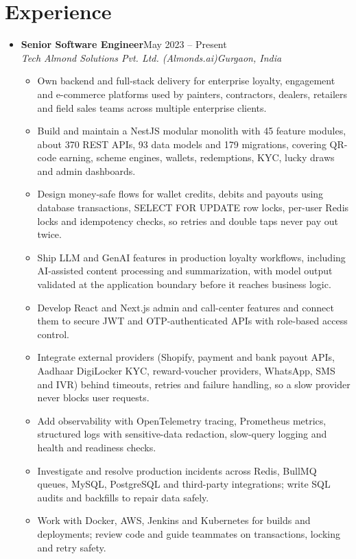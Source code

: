 \documentclass[letterpaper,10pt]{article}
\newcommand{\itemx}[1]{\item\small{#1\vspace{-2pt}}}
\newcommand{\subheading}[4]{\item \textbf{#1}\hfill #2\\\textit{\small #3}\hfill\textit{\small #4}\vspace{-5pt}}
\begin{document}
\section{Experience}
\begin{itemize}[leftmargin=.15in,label={}]
\subheading{Senior Software Engineer}{May 2023 -- Present}{Tech Almond Solutions Pvt. Ltd. (Almonds.ai)}{Gurgaon, India}
\begin{itemize}[leftmargin=.18in]
\itemx{Own backend and full-stack delivery for enterprise loyalty, engagement and e-commerce platforms used by painters, contractors, dealers, retailers and field sales teams across multiple enterprise clients.}
\itemx{Build and maintain a NestJS modular monolith with 45 feature modules, about 370 REST APIs, 93 data models and 179 migrations, covering QR-code earning, scheme engines, wallets, redemptions, KYC, lucky draws and admin dashboards.}
\itemx{Design money-safe flows for wallet credits, debits and payouts using database transactions, SELECT FOR UPDATE row locks, per-user Redis locks and idempotency checks, so retries and double taps never pay out twice.}
\itemx{Ship LLM and GenAI features in production loyalty workflows, including AI-assisted content processing and summarization, with model output validated at the application boundary before it reaches business logic.}
\itemx{Develop React and Next.js admin and call-center features and connect them to secure JWT and OTP-authenticated APIs with role-based access control.}
\itemx{Integrate external providers (Shopify, payment and bank payout APIs, Aadhaar DigiLocker KYC, reward-voucher providers, WhatsApp, SMS and IVR) behind timeouts, retries and failure handling, so a slow provider never blocks user requests.}
\itemx{Add observability with OpenTelemetry tracing, Prometheus metrics, structured logs with sensitive-data redaction, slow-query logging and health and readiness checks.}
\itemx{Investigate and resolve production incidents across Redis, BullMQ queues, MySQL, PostgreSQL and third-party integrations; write SQL audits and backfills to repair data safely.}
\itemx{Work with Docker, AWS, Jenkins and Kubernetes for builds and deployments; review code and guide teammates on transactions, locking and retry safety.}
\end{itemize}
\end{itemize}
\end{document}
